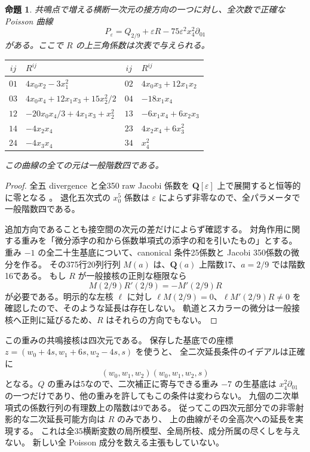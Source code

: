 \documentclass[11pt,a4paper]{ltjsarticle}
\newcommand{\QQ}{\mathbf Q}
\newtheorem{proposition}[theorem]{命題}
\theoremstyle{remark}
\begin{document}
\begin{proposition}\label{prop:resonant-direction-v62}
共鳴点で増える横断一次元の接方向の一つに対し、全次数で正確な Poisson 曲線
\[
 P_\varepsilon=Q_{2/9}+\varepsilon R-75\varepsilon^2x_4^2\partial_{01}
\]
がある。ここで $R$ の上三角係数は次表で与えられる。
\begin{center}
\begin{tabular}{cl@{\qquad}cl}\toprule
$ij$&$R^{ij}$&$ij$&$R^{ij}$\\\midrule
$01$&$4x_0x_2-3x_1^2$&$02$&$4x_0x_3+12x_1x_2$\\
$03$&$4x_0x_4+12x_1x_3+15x_2^2/2$&$04$&$-18x_1x_4$\\
$12$&$-20x_0x_4/3+4x_1x_3+x_2^2$&$13$&$-6x_1x_4+6x_2x_3$\\
$14$&$-4x_2x_4$&$23$&$4x_2x_4+6x_3^2$\\
$24$&$-4x_3x_4$&$34$&$x_4^2$\\\bottomrule
\end{tabular}
\end{center}
この曲線の全ての元は一般階数四である。
\end{proposition}
\begin{proof}
全五 divergence と全350 raw Jacobi 係数を $\QQ[\varepsilon]$ 上で展開すると恒等的に零となる
\cite{resonant-direction-v62}。
退化五次式の $x_0^5$ 係数は $\varepsilon$ によらず非零なので、全パラメータで一般階数四である。

追加方向であることも接空間の次元の差だけによらず確認する。
対角作用に関する重みを「微分添字の和から係数単項式の添字の和を引いたもの」とする。
重み $-1$ の全二十生基底について、canonical 条件25係数と Jacobi 350係数の微分を作る。
その375行20列行列 $M(a)$ は、$\QQ(a)$ 上階数17、$a=2/9$ では階数16である。
もし $R$ が一般接核の正則な極限なら
\[
 M(2/9)R'(2/9)=-M'(2/9)R
\]
が必要である。明示的な左核 $\ell$ に対し
$\ell M(2/9)=0$、$\ell M'(2/9)R\ne0$ を確認したので、そのような延長は存在しない。
軌道とスカラーの微分は一般接核へ正則に延びるため、$R$ はそれらの方向でもない。
\end{proof}

この重みの共鳴接核は四次元である。
保存した基底での座標 $z=(w_0+4s,w_1+6s,w_2-4s,s)$ を使うと、
全二次延長条件のイデアルは正確に
\[
 (w_0,w_1,w_2)(w_0,w_1,w_2,s)
\]
となる。$Q$ の重みは5なので、二次補正に寄与できる重み $-7$ の生基底は
$x_4^2\partial_{01}$ の一つだけであり、他の重みを許してもこの条件は変わらない。
九個の二次単項式の係数行列の有理数上の階数は9である。
従ってこの四次元部分での非零射影的な二次延長可能方向は $R$ のみであり、
上の曲線がその全高次への延長を実現する。
これは全35横断変数の局所模型、全局所枝、成分所属の尽くしを与えない。
新しい全 Poisson 成分を数える主張もしていない。
\end{document}
